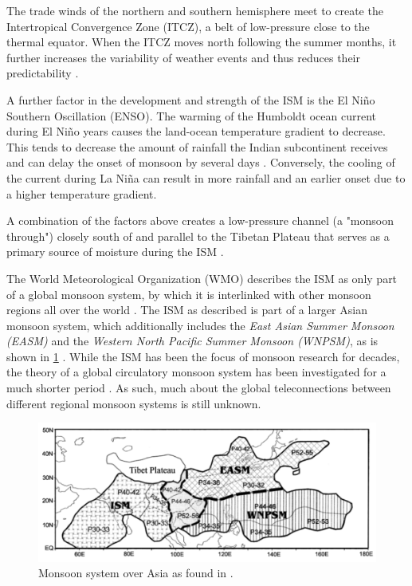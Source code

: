 The trade winds of the northern and southern hemisphere meet to create the Intertropical Convergence Zone (ITCZ), a belt of low-pressure close to the thermal equator. When the ITCZ moves north following the summer months, it further increases the variability of weather events and thus reduces their predictability \citep{Stolbova.2015}.

A further factor in the development and strength of the ISM is the El Niño Southern Oscillation (ENSO). The warming of the Humboldt ocean current during El Niño years causes the land-ocean temperature gradient to decrease. This tends to decrease the amount of rainfall the Indian subcontinent receives and can delay the onset of monsoon by several days \citep{Pradhan.2017, Willetts.2017}. Conversely, the cooling of the current during La Niña can result in more rainfall and an earlier onset due to a higher temperature gradient.

A combination of the factors above creates a low-pressure channel (a "monsoon through") closely south of and parallel to the Tibetan Plateau that serves as a primary source of moisture during the ISM \citep{Stolbova.2015}.

The World Meteorological Organization (WMO) describes the ISM as only part of a global monsoon system, by which it is interlinked with other monsoon regions all over the world \citep{WorldMeteorologicalOrganization.2005}. The ISM as described is part of a larger Asian monsoon system, which additionally includes the \textit{East Asian Summer Monsoon (EASM)} and the \textit{Western North Pacific Summer Monsoon (WNPSM)}, as is shown in \cref{fig:monsoon_system} \citep{Yihui.2005}. While the ISM has been the focus of monsoon research for decades, the theory of a global circulatory monsoon system has been investigated for a much shorter period \citep{WorldMeteorologicalOrganization.2005}. As such, much about the global teleconnections between different regional monsoon systems is still unknown.

\begin{figure}[h]
  \centering
  \includegraphics[width=0.55\linewidth]{./99_appendix/img/monsoon_system}
  \caption{Monsoon system over Asia as found in \citet{Yihui.2005}.}
  \label{fig:monsoon_system}
\end{figure}

